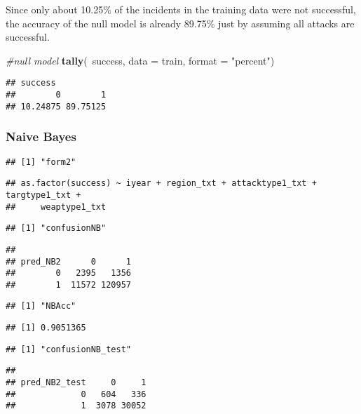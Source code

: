 \documentclass[11pt,letterpaper,]{article}
\newenvironment{Shaded}{\begin{snugshade}}{\end{snugshade}}
\newcommand{\KeywordTok}[1]{\textcolor[rgb]{0.13,0.29,0.53}{\textbf{{#1}}}}
\newcommand{\DataTypeTok}[1]{\textcolor[rgb]{0.13,0.29,0.53}{{#1}}}
\newcommand{\StringTok}[1]{\textcolor[rgb]{0.31,0.60,0.02}{{#1}}}
\newcommand{\CommentTok}[1]{\textcolor[rgb]{0.56,0.35,0.01}{\textit{{#1}}}}
\newcommand{\NormalTok}[1]{{#1}}
\theoremstyle{definition}
\theoremstyle{definition}
\theoremstyle{definition}
\theoremstyle{remark}
\begin{document}
Since only about 10.25\% of the incidents in the training data were not
successful, the accuracy of the null model is already 89.75\% just by
assuming all attacks are successful.

\begin{Shaded}
\begin{Highlighting}[]
\CommentTok{#null model}
\KeywordTok{tally}\NormalTok{(~success, }\DataTypeTok{data =} \NormalTok{train, }\DataTypeTok{format =} \StringTok{"percent"}\NormalTok{)}
\end{Highlighting}
\end{Shaded}

\begin{verbatim}
## success
##        0        1 
## 10.24875 89.75125
\end{verbatim}

\subsubsection{Naive Bayes}\label{naive-bayes-1}

\begin{verbatim}
## [1] "form2"
\end{verbatim}

\begin{verbatim}
## as.factor(success) ~ iyear + region_txt + attacktype1_txt + targtype1_txt + 
##     weaptype1_txt
\end{verbatim}

\begin{verbatim}
## [1] "confusionNB"
\end{verbatim}

\begin{verbatim}
##         
## pred_NB2      0      1
##        0   2395   1356
##        1  11572 120957
\end{verbatim}

\begin{verbatim}
## [1] "NBAcc"
\end{verbatim}

\begin{verbatim}
## [1] 0.9051365
\end{verbatim}

\begin{verbatim}
## [1] "confusionNB_test"
\end{verbatim}

\begin{verbatim}
##              
## pred_NB2_test     0     1
##             0   604   336
##             1  3078 30052
\end{verbatim}
\end{document}
